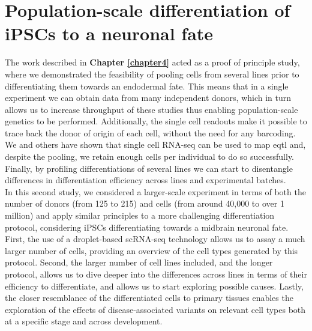 
\chapter{Population-scale differentiation of iPSCs to a neuronal fate}
\label{chapter5}

The work described in \textbf{Chapter 
\ref{chapter4}}
acted as a proof of principle study, where we demonstrated the feasibility of pooling cells from several lines prior to differentiating them towards an endodermal fate.
This means that in a single experiment we can obtain data from many independent donors, which in turn allows us to increase throughput of these studies thus enabling population-scale genetics to be performed.
Additionally, the single cell readouts make it possible to trace back the donor of origin of each cell, without the need for any barcoding.
We and others have shown that single cell RNA-seq can be used to map \gls{eqtl} and, despite the pooling, we retain enough cells per individual to do so successfully.
Finally, by profiling differentiations of several lines we can start to disentangle differences in differentiation efficiency across lines and experimental batches. \\

In this second study, we considered a larger-scale experiment in terms of both the number of donors (from 125 to 215) and cells (from around 40,000 to over 1 million) and apply similar principles to a more challenging differentiation protocol, considering iPSCs differentiating towards a midbrain neuronal fate.
First, the use of a droplet-based scRNA-seq technology allows us to assay a much larger number of cells, providing an overview of the 
cell types generated by this protocol. 
Second, the larger number of cell lines included, and the longer protocol, allows us to dive deeper into the differences across lines in terms of their efficiency to differentiate, and allows us to start exploring possible causes.
Lastly, the closer resemblance of the differentiated cells to primary tissues enables the exploration of the effects of disease-associated variants on relevant cell types both at a specific stage and across development. 

